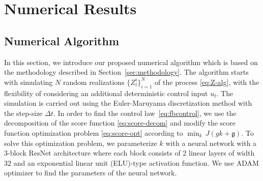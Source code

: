 \documentclass[letterpaper, 10 pt, conference]{ieeeconf}  %
\def\Expect{{\mathbb E}}
\begin{document}
\section{Numerical Results}\label{sec:results}
\subsection{Numerical Algorithm}
\label{sec:Algorithm}
In this section, we introduce our proposed numerical algorithm which is based on the methodology described in Section~\ref{sec:methodology}. The algorithm starts with simulating $N$ random realizations $\{Z^i_t\}_{i=1}^N$ of the process \eqref{eq:Z-alg}, with the flexibility of considering an additional  deterministic control input $u_t$. The simulation is carried out using the Euler-Maruyama discretization method with the step-size $\Delta t$. In order to find the control law~\eqref{eq:fbcontrol}, we use the decomposition  of the score function \eqref{eq:score-decom} and modify the score function optimization problem \eqref{eq:score-opt} according to $\min_k\,J(gk+\mathfrak g)$. 
To solve this optimization problem, we parameterize $k$ with a neural network with a 3-block ResNet architecture where each block consists of 2 linear layers of width 32 and an exponential linear unit (ELU)-type activation function. We use ADAM optimizer to find the parameters of the neural network.
\end{document}
